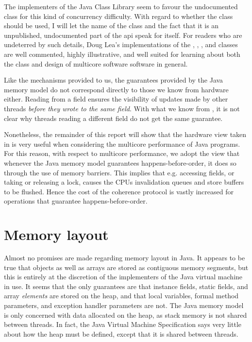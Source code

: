 The implementers of the Java Class Library seem to favour the undocumented
 class for this kind of concurrency difficulty. With
regard to whether the  class should be used, I will
let the name of the class and the fact that it is an unpublished, undocumented part
of the api speak for itself. For readers who are undeterred by such details,
Doug Lea's implementations of the \cite{atomicintegersrc},
\cite{atomicinterarraysrc},
\cite{longaddersrc}, and \cite{striped64src}
classes are well commented, highly illustrative, and well suited for learning
about both the  class and design of multicore software software in
general.

Like the mechanisms provided to us, the guarantees provided by the Java memory
model do not correspond directly to those we know from hardware either. Reading
from a  field ensures the visibility of updates made by other
threads \textit{before they wrote to the same field}. With what we know from
\cite{mckenny-barriers}, it is not clear why threads reading a different
 field do not get the same guarantee.

Nonetheless, the remainder of this report will show that the hardware view taken
in \cite{mckenny-barriers} is very useful when considering the multicore
performance of Java programs. For this reason, with respect to multicore performance, we adopt
the view that whenever the Java memory model guarantees happens-before-order, it
does so through the use of memory barriers. This implies that e.g. accessing
 fields, or taking or releasing a lock, causes the CPUs
invalidation queues and store buffers to be flushed. Hence the cost of the
coherence protocol is vastly increased for operations that guarantee
happens-before-order.

\section{Memory layout} Almost no promises are made regarding memory layout in
Java. It appears to be true that objects as well as arrays are stored as
contiguous memory segments,
but this is entirely at the discretion of the implementers of the Java virtual
machine in use. It seems that the only guarantees are that instance
fields, static fields, and array \textit{elements} are stored on the heap, and
that local variables, formal method parameters, and exception handler parameters
are not\cite[chapter~17]{javaspec}\cite[chapter~2]{jvmspec}. The Java memory
model is only concerned with data allocated on the heap, as stack memory is not
shared between threads. In fact, the Java Virtual Machine
Specification\cite{jvmspec} says very little about how the heap must be defined,
except that it is shared between threads.

